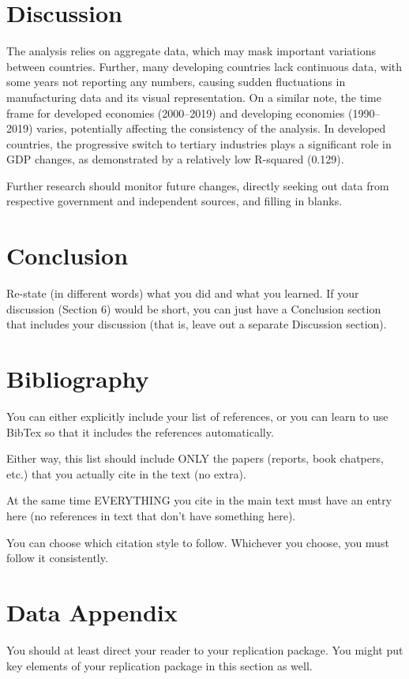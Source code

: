 \documentclass[12pt]{article}
\begin{document}
\section{Discussion}
\label{sec:discussion}

The analysis relies on aggregate data, which may mask important variations between countries. Further, many developing countries lack continuous data, with some years not reporting any numbers, causing sudden fluctuations in manufacturing data and its visual representation. On a similar note, the time frame for developed economies (2000–2019) and developing economies (1990–2019) varies, potentially affecting the consistency of the analysis.
In developed countries, the progressive switch to tertiary industries plays a significant role in GDP changes, as demonstrated by a relatively low R-squared (0.129).

Further research should monitor future changes, directly seeking out data from respective government and independent sources, and filling in blanks.


\section{Conclusion}
\label{sec:conclusion}

Re-state (in different words) what you did and what you learned. If your discussion (Section 6) would be short, you can just have a Conclusion section that includes your discussion (that is, leave out a separate Discussion section).

\newpage
\section*{Bibliography}
\singlespacing
\setlength\bibsep{0pt}

You can either explicitly include your list of references, or you can learn to use BibTex so that it includes the references automatically.

Either way, this list should include ONLY the papers (reports, book chatpers, etc.) that you actually cite in the text (no extra).

At the same time EVERYTHING you cite in the main text must have an entry here (no references in text that don't have something here).

You can choose which citation style to follow. Whichever you choose, you must follow it consistently.

\newpage
\section*{Data Appendix} \label{sec:appendixa}

You should at least direct your reader to your replication package. You might put key elements of your replication package in this section as well.
\end{document}
